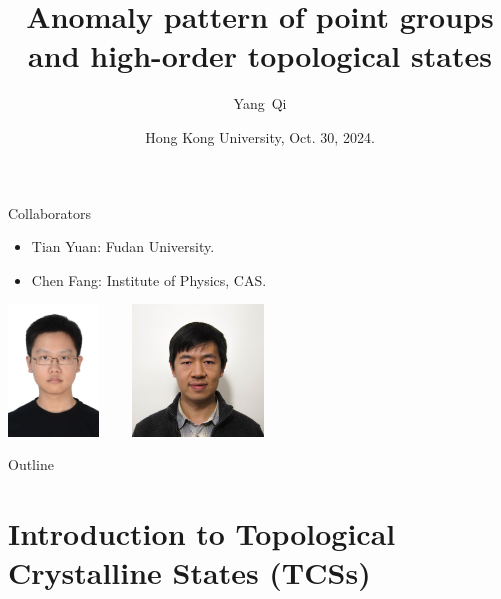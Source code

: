 \documentclass[xcolor=table, 11pt, aspectratio=169]{beamer}
\title[Space-group SPTs] %
{Anomaly pattern of point groups and high-order topological states}
\author[Y Qi] %
{Yang~Qi}
\institute[Fudan] %
{Department of Physics, Fudan University}
\date{Hong Kong University, Oct. 30, 2024.}
\begin{document}
\begin{frame}
  \titlepage
\end{frame}

\begin{frame}{Collaborators}
  \begin{itemize}
  \item Tian Yuan: Fudan University.
  \item Chen Fang: Institute of Physics, CAS.
\end{itemize}
\vspace{4em}
\begin{center}
        \includegraphics[height=3.5cm]{../people/tianyuan}~~~~
      \includegraphics[height=3.5cm]{../people/chenfang}
    \end{center}
\end{frame}

\begin{frame}{Outline}
      \tableofcontents
\end{frame}


\section{Introduction to Topological Crystalline States (TCSs)}
\end{document}
